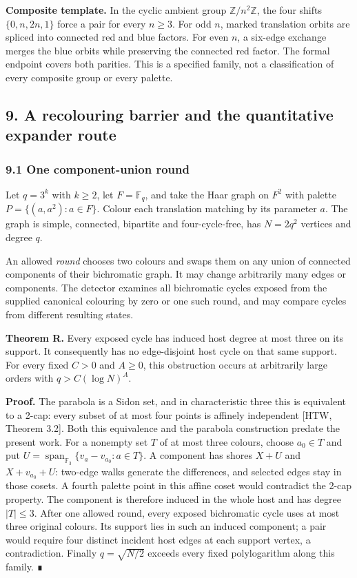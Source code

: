 \documentclass[
  11pt,
]{article}
\newcounter{none} %
\begin{document}
\textbf{Composite template.} In the cyclic ambient group
\(\mathbb Z/n^2\mathbb Z\), the four shifts \(\{0,n,2n,1\}\) force a
pair for every \(n\geq3\). For odd \(n\), marked translation orbits are
spliced into connected red and blue factors. For even \(n\), a six-edge
exchange merges the blue orbits while preserving the connected red
factor. The formal endpoint covers both parities. This is a specified
family, not a classification of every composite group or every palette.

\subsection{9. A recolouring barrier and the quantitative expander
route}\label{a-recolouring-barrier-and-the-quantitative-expander-route}

\subsubsection{9.1 One component-union
round}\label{one-component-union-round}

Let \(q=3^k\) with \(k\geq2\), let \(F=\mathbb F_q\), and take the Haar
graph on \(F^2\) with palette \(P=\{(a,a^2):a\in F\}\). Colour each
translation matching by its parameter \(a\). The graph is simple,
connected, bipartite and four-cycle-free, has \(N=2q^2\) vertices and
degree \(q\).

An allowed \emph{round} chooses two colours and swaps them on any union
of connected components of their bichromatic graph. It may change
arbitrarily many edges or components. The detector examines all
bichromatic cycles exposed from the supplied canonical colouring by zero
or one such round, and may compare cycles from different resulting
states.

\textbf{Theorem R.} Every exposed cycle has induced host degree at most
three on its support. It consequently has no edge-disjoint host cycle on
that same support. For every fixed \(C>0\) and \(A\geq0\), this
obstruction occurs at arbitrarily large orders with \(q>C(\log N)^A\).

\textbf{Proof.} The parabola is a Sidon set, and in characteristic three
this is equivalent to a 2-cap: every subset of at most four points is
affinely independent {[}HTW, Theorem 3.2{]}. Both this equivalence and
the parabola construction predate the present work. For a nonempty set
\(T\) of at most three colours, choose \(a_0\in T\) and put
\(U=\operatorname{span}_{\mathbb F_3}\{v_a-v_{a_0}:a\in T\}\). A
component has shores \(X+U\) and \(X+v_{a_0}+U\): two-edge walks
generate the differences, and selected edges stay in those cosets. A
fourth palette point in this affine coset would contradict the 2-cap
property. The component is therefore induced in the whole host and has
degree \(|T|\leq3\). After one allowed round, every exposed bichromatic
cycle uses at most three original colours. Its support lies in such an
induced component; a pair would require four distinct incident host
edges at each support vertex, a contradiction. Finally \(q=\sqrt{N/2}\)
exceeds every fixed polylogarithm along this family. ∎
\end{document}
